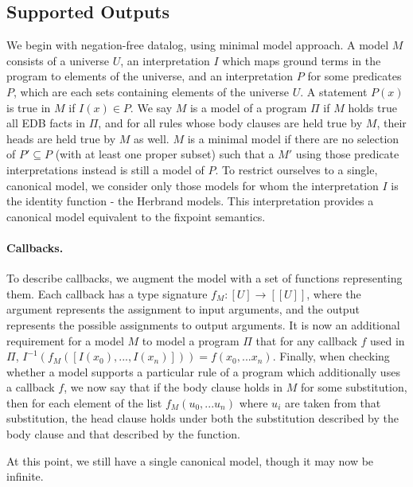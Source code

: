 \subsection{Supported Outputs}
\label{sec:allowed}
We begin with negation-free datalog, using minimal model approach.
A model $M$ consists of a universe $U$, an interpretation $I$ which maps ground terms in the program to elements of the universe, and an interpretation $P$ for some predicates $P$, which are each sets containing elements of the universe $U$.
A statement $P(x)$ is true in $M$ if $I(x) \in P$.
We say $M$ is a model of a program $\Pi$ if $M$ holds true all EDB facts in $\Pi$, and for all rules whose body clauses are held true by $M$, their heads are held true by $M$ as well.
$M$ is a minimal model if there are no selection of $P' \subseteq P$ (with at least one proper subset) such that a $M'$ using those predicate interpretations instead is still a model of $P$.
To restrict ourselves to a single, canonical model, we consider only those models for whom the interpretation $I$ is the identity function - the Herbrand models.
This interpretation provides a canonical model equivalent to the fixpoint semantics.

\paragraph{Callbacks.}
To describe callbacks, we augment the model with a set of functions representing them.
Each callback has a type signature $f_M : [U] \rightarrow [[U]]$, where the argument represents the assignment to input arguments, and the output represents the possible assignments to output arguments.
It is now an additional requirement for a model $M$ to model a program $\Pi$ that for any callback $f$ used in $\Pi$, $I^{-1}(f_M([I(x_0), ...,I(x_n)])) = f(x_0, ... x_n)$.
Finally, when checking whether a model supports a particular rule of a program which additionally uses a callback $f$, we now say that if the body clause holds in $M$ for some substitution, then for each element of the list $f_M(u_0, ... u_n)$ where $u_i$ are taken from that substitution, the head clause holds under both the substitution described by the body clause and that described by the function.

At this point, we still have a single canonical model, though it may now be infinite.

